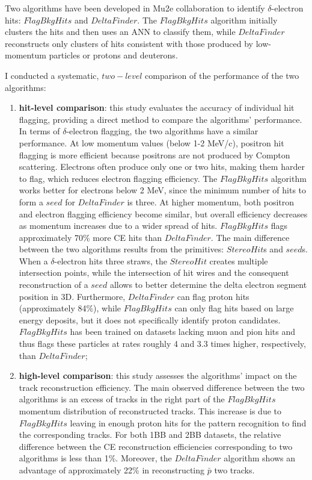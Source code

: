 Two algorithms have been developed in Mu2e collaboration to identify 
$\delta$-electron hits: $FlagBkgHits$ and $DeltaFinder$.
The $FlagBkgHits$ algorithm initially clusters the hits and then uses an ANN 
to classify them, while $DeltaFinder$ reconstructs only clusters of hits  
consistent with those produced by low-momentum particles or protons and deuterons.


I conducted a systematic, $two-level$ comparison of the performance 
of the two algorithms:
\begin{enumerate}
    \item \textbf{hit-level comparison}: this study evaluates the accuracy 
    of individual hit flagging, providing a direct method to compare 
    the algorithms' performance. In terms of $\delta$-electron flagging, 
    the two algorithms have a similar performance. 
    At low momentum values (below 1-2 MeV/c), positron hit flagging 
    is more efficient because positrons are not produced by Compton scattering. 
    Electrons often produce only one or two hits, making them harder 
    to flag, which reduces electron flagging 
    efficiency. The $FlagBkgHits$ algorithm works better for electrons below 
    2 MeV, since the minimum number of hits to form a $seed$ for 
    $DeltaFinder$ is three. At higher momentum, both positron and 
    electron flagging efficiency become similar, but overall efficiency 
    decreases as momentum increases due to a wider spread of hits.
    $FlagBkgHits$ flags approximately 70\% more CE hits than $DeltaFinder$.
    The main difference between the two algorithms results from  
    the primitives: $StereoHit$s and $seed$s. When a $\delta$-electron hits three 
    straws, the $StereoHit$ creates multiple intersection points, while the 
    intersection of hit wires and the consequent reconstruction of 
    a $seed$ allows to better determine the delta electron segment position in 3D. 
    Furthermore, $DeltaFinder$ can flag proton hits (approximately 84\%), while $FlagBkgHits$ 
    can only flag hits based on large energy deposits, but it does not specifically identify proton candidates.
  $FlagBkgHits$ has been trained on datasets lacking 
  muon and pion hits and thus flags these particles at rates roughly 
  4 and 3.3 times higher, respectively, than $DeltaFinder$;

\item  \textbf{high-level comparison}: this study 
assesses the algorithms' impact on 
the track reconstruction efficiency. The main observed difference between the two algorithms 
is an excess of tracks in the right part of the 
$FlagBkgHits$ momentum distribution of reconstructed tracks. 
This increase is due to $FlagBkgHits$ leaving in 
enough proton hits for the pattern 
recognition to find the corresponding tracks. 
For both 1BB and 2BB datasets, the relative difference between the 
CE reconstruction efficiencies corresponding to two algorithms is less than 1\%.
Moreover, the $DeltaFinder$ algorithm shows an advantage of 
approximately 22\% in reconstructing $\bar{p}$ two tracks.

\end{enumerate}


